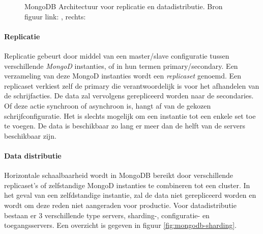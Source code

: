 \begin{figure}[ht!] 
\centering
	\hfill
	\caption{MongoDB Architectuur voor replicatie en datadistributie. Bron figuur link: \cite{mongodb-replicaset}, rechts: \cite{mongodb-shard}}
	\label{fig:mongodb-architectuur}
\end{figure}

\paragraph{Replicatie\cite{mongodb-replicaset}} Replicatie gebeurt door middel van een master/slave configuratie tussen verschillende \textit{MongoD} instanties, of in hun termen primary/secondary. Een verzameling van deze MongoD instanties wordt een \textit{replicaset} genoemd. Een replicaset verkiest zelf de primary die verantwoordelijk is voor het afhandelen van de schrijfacties. De data zal vervolgens gerepliceerd worden naar de secondaries. Of deze actie synchroon of asynchroon is, hangt af van de gekozen schrijfconfiguratie.  Het is slechts mogelijk om een instantie tot een enkele set toe te voegen. De data is beschikbaar zo lang er meer dan de helft van de servers beschikbaar zijn. 

\paragraph{Data distributie\cite{mongodb-shard}} Horizontale schaalbaarheid wordt in MongoDB bereikt door verschillende replicaset's of zelfstandige MongoD instanties te combineren tot een cluster. In het geval van een zelfdstandige instantie, zal de data niet gerepliceerd worden en wordt om deze reden niet aangeraden voor productie. Voor datadistributie bestaan er 3 verschillende type servers, sharding-, configuratie- en toegangsservers. Een overzicht is gegeven in figuur \ref{fig:mongodb-sharding}. 

